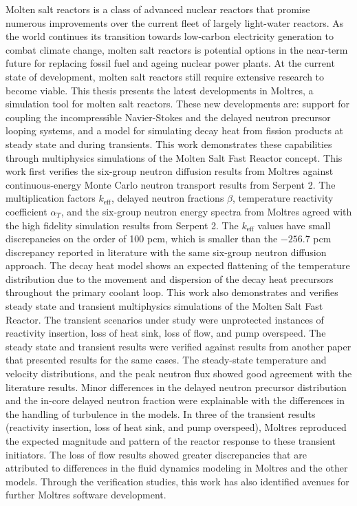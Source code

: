 Molten salt reactors is a class of advanced nuclear reactors that promise
numerous improvements over the current fleet of largely light-water reactors.
As the world continues its transition towards low-carbon electricity
generation to combat climate change, molten salt reactors is potential
options in the near-term future for replacing fossil fuel and ageing nuclear
power plants. At the current state of development, molten salt reactors still
require extensive research to become viable. This thesis presents the latest
developments in Moltres, a simulation tool for molten salt reactors. These new
developments are: support for coupling the incompressible Navier-Stokes and
the delayed neutron precursor looping systems, and a model for
simulating decay heat from fission products at steady state and during
transients. This work demonstrates these capabilities through multiphysics
simulations of the Molten Salt Fast
Reactor concept. This work first verifies the six-group neutron diffusion
results from Moltres against continuous-energy Monte Carlo neutron transport
results from Serpent 2. The multiplication factors $k_{\text{eff}}$, delayed
neutron fractions $\beta$, temperature reactivity coefficient $\alpha_T$, and
the six-group neutron energy spectra from Moltres agreed with the high
fidelity simulation results from Serpent 2. The $k_{\text{eff}}$ values have
small discrepancies on the order of 100 pcm, which is smaller than the
$-256.7$ pcm discrepancy reported in literature with the same six-group
neutron diffusion approach. The decay heat model shows an expected flattening
of the temperature distribution due to the movement and dispersion of the
decay heat precursors throughout the primary coolant loop. This work also
demonstrates and verifies steady state and
transient multiphysics simulations of the Molten Salt Fast Reactor. The
transient scenarios under study were unprotected instances of reactivity
insertion, loss of heat sink, loss of flow, and pump overspeed. The steady
state and transient results were verified against results from another paper
that presented results for the same cases. The steady-state temperature and
velocity distributions, and the peak neutron flux showed good agreement with
the literature results. Minor differences in the delayed neutron precursor
distribution and the in-core delayed neutron fraction were explainable with
the differences in the handling of turbulence in the models. In three of the
transient results (reactivity insertion, loss of heat sink, and pump
overspeed), Moltres reproduced the expected magnitude and pattern of the
reactor response to these transient initiators.
The loss of flow results showed greater discrepancies that are attributed
to differences in the fluid dynamics modeling in Moltres and the other models.
Through the verification studies, this work has also identified avenues
for further Moltres software development.